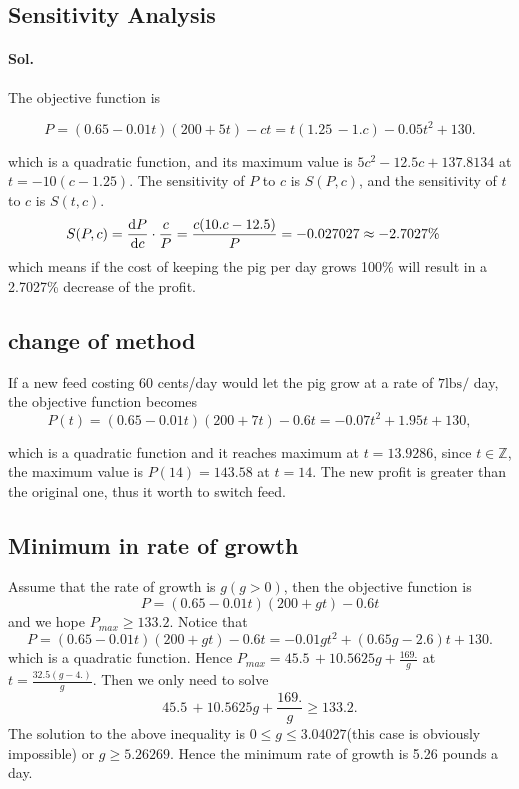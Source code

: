 \documentclass[11pt]{article}
\begin{document}
\subsection{Sensitivity Analysis}
\paragraph{Sol.}
The objective function is

$$
 P =(0.65-0.01 t)(200+5 t)-c t  = t (1.25\, -1. c)-0.05 t^2+130.
$$

which is a quadratic function, and its maximum value is $5c^2-12.5 c+137.8134$ at $t = -10 ( c-1.25)$. The sensitivity of $P$ to $c$ is $S(P,c)$, and the sensitivity of $t$ to $c$ is $S(t,c)$.
$$
\begin{align*}
	S(P,c) &= \frac{\textrm d P}{\textrm d c} \cdot \frac{c}{P} = \frac{c (10. c-12.5)}{P} = -0.027027 \approx -2.7027\%
\end{align*}
$$
which means if the cost of keeping the pig per day grows 100\% will result in a 2.7027\% decrease of the profit.

\subsection{change of method}
If a new feed costing 60 cents/day would let the pig grow at a rate of $7 \mathrm{lbs} /$ day,  the objective function becomes
$$
P(t) = (0.65 - 0.01 t) (200 + 7 t) - 0.6 t = -0.07 t^2+1.95 t+130,
$$

which is a quadratic function and it reaches maximum at $t = 13.9286$, since $t\in \mathbb Z$, the maximum value is $P(14)  = 143.58$ at $t = 14$. The new profit is greater than the original one, thus it worth to switch feed. 

\subsection{Minimum in rate of growth}
Assume that the rate of growth is $g(g>0)$, then the objective function is 
$$
 P =(0.65-0.01 t)(200+g t)-0.6 t 
$$
and we hope $P_{max} \geq 133.2$.
Notice that 
$$
P =(0.65-0.01 t)(200+g t)-0.6 t = -0.01 g t^2+(0.65 g-2.6) t+130.
$$
which is a quadratic function. Hence $P_{max} = 45.5\, +10.5625 g+\frac{169.}{g}$ at $t = \frac{32.5 (g-4.)}{g}$. Then we only need to solve 
$$
 45.5\, +10.5625 g+\frac{169.}{g}\geq 133.2.
$$
The solution to the above inequality is $0\leq g \leq 3.04027$(this case is obviously impossible) or $g\geq 5.26269$. Hence the minimum rate of growth is 5.26 pounds a day.
\end{document}
